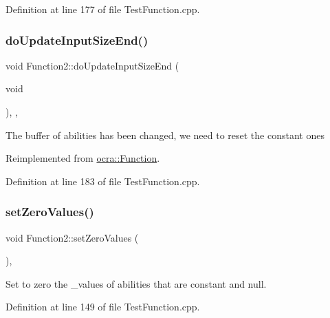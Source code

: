 Definition at line 177 of file Test\+Function.\+cpp.

\hypertarget{classFunction2_a6a875214e7fa8b07f064cd699ac29ff6}{}\label{classFunction2_a6a875214e7fa8b07f064cd699ac29ff6} 
\subsubsection{\texorpdfstring{do\+Update\+Input\+Size\+End()}{doUpdateInputSizeEnd()}}
{\footnotesize\ttfamily void Function2\+::do\+Update\+Input\+Size\+End (\begin{DoxyParamCaption}\item[{void}]{ }\end{DoxyParamCaption})\hspace{0.3cm}{\ttfamily [inline]}, {\ttfamily [protected]}, {\ttfamily [virtual]}}

The buffer of abilities has been changed, we need to reset the constant ones 

Reimplemented from \hyperlink{classocra_1_1Function_a39f6d91b72eff2d32da7e4a85ee79f7d}{ocra\+::\+Function}.



Definition at line 183 of file Test\+Function.\+cpp.

\hypertarget{classFunction2_ad1ba3ed750cfec23435dcd9f37c10eec}{}\label{classFunction2_ad1ba3ed750cfec23435dcd9f37c10eec} 
\subsubsection{\texorpdfstring{set\+Zero\+Values()}{setZeroValues()}}
{\footnotesize\ttfamily void Function2\+::set\+Zero\+Values (\begin{DoxyParamCaption}{ }\end{DoxyParamCaption})\hspace{0.3cm}{\ttfamily [inline]}, {\ttfamily [protected]}}

Set to zero the \+\_\+values of abilities that are constant and null. 

Definition at line 149 of file Test\+Function.\+cpp.

\hypertarget{classFunction2_a79440b2c9d2e8f80abe1d35352f49a1c}{}\label{classFunction2_a79440b2c9d2e8f80abe1d35352f49a1c} 
